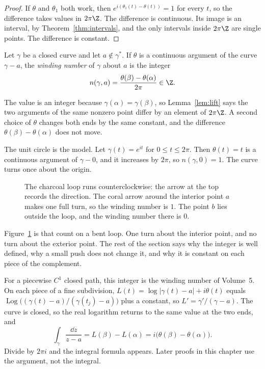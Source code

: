 \begin{proof}
If $\theta$ and $\theta_1$ both work, then $e^{i(\theta_1(t)-\theta(t))}=1$ for every $t$, so the difference takes values in $2\pi\Z$. The difference is continuous. Its image is an interval, by Theorem~\ref{thm:intervals}, and the only intervals inside $2\pi\Z$ are single points. The difference is constant.
\end{proof}

\begin{definition}
Let $\gamma$ be a closed curve and let $a\notin\gamma^*$. If $\theta$ is a continuous argument of the curve $\gamma-a$, the \emph{winding number} of $\gamma$ about $a$ is the integer
\[
n(\gamma,a)=\frac{\theta(\beta)-\theta(\alpha)}{2\pi}\in\Z.
\]
\end{definition}

The value is an integer because $\gamma(\alpha)=\gamma(\beta)$, so Lemma~\ref{lem:lift} says the two arguments of the same nonzero point differ by an element of $2\pi\Z$. A second choice of $\theta$ changes both ends by the same constant, and the difference $\theta(\beta)-\theta(\alpha)$ does not move.

The unit circle is the model. Let $\gamma(t)=e^{it}$ for $0\le t\le 2\pi$. Then $\theta(t)=t$ is a continuous argument of $\gamma-0$, and it increases by $2\pi$, so $n(\gamma,0)=1$. The curve turns once about the origin.

\begin{figure}[ht]
\centering
{}
\caption{The charcoal loop runs counterclockwise: the arrow at the top records the direction. The coral arrow around the interior point $a$ makes one full turn, so the winding number is $1$. The point $b$ lies outside the loop, and the winding number there is $0$.}
\label{fig:windingarg}
\end{figure}

Figure~\ref{fig:windingarg} is that count on a bent loop. One turn about the interior point, and no turn about the exterior point. The rest of the section says why the integer is well defined, why a small push does not change it, and why it is constant on each piece of the complement.

For a piecewise $C^1$ closed path, this integer is the winding number of Volume~5. On each piece of a fine subdivision, $L(t)=\log|\gamma(t)-a|+i\theta(t)$ equals $\operatorname{Log}\bigl((\gamma(t)-a)/(\gamma(t_j)-a)\bigr)$ plus a constant, so $L'=\gamma'/(\gamma-a)$. The curve is closed, so the real logarithm returns to the same value at the two ends, and
\[
\int_\gamma\frac{\dd z}{z-a}=L(\beta)-L(\alpha)=i\bigl(\theta(\beta)-\theta(\alpha)\bigr).
\]
Divide by $2\pi i$ and the integral formula appears. Later proofs in this chapter use the argument, not the integral.

